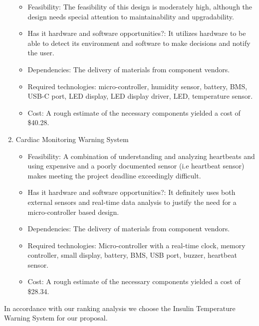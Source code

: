 \begin{enumerate}
\begin{itemize}
          \item Feasibility: The feasibility of this design is moderately high, although the design needs special attention to maintainability and upgradability.
          \item Has it hardware and software opportunities?: It utilizes hardware to be able to detect its environment and software to make decisions and notify the user.
          \item Dependencies: The delivery of materials from component vendors.
          \item Required technologies: micro-controller, humidity sensor, battery, BMS, USB-C port, LED display, LED display driver, LED, temperature sensor.
          \item Cost: A rough estimate of the necessary components yielded a cost of \$40.28.
        \end{itemize}
	 \item Cardiac Monitoring Warning System
        \begin{itemize}
          \item Feasibility: A combination of understanding and analyzing heartbeats and using expensive and a poorly documented sensor (i.e heartbeat sensor) makes meeting the project deadline exceedingly difficult.
          \item Has it hardware and software opportunities?: It definitely uses both external sensors and real-time data analysis to justify the need for a micro-controller based design.
          \item Dependencies: The delivery of materials from component vendors.
          \item Required technologies: Micro-controller with a real-time clock, memory controller, small display, battery, BMS, USB port, buzzer, heartbeat sensor.
          \item Cost: A rough estimate of the necessary components yielded a cost of \$28.34.
        \end{itemize}
\end{enumerate}
In accordance with our ranking analysis we choose the Insulin Temperature Warning System for our proposal.
